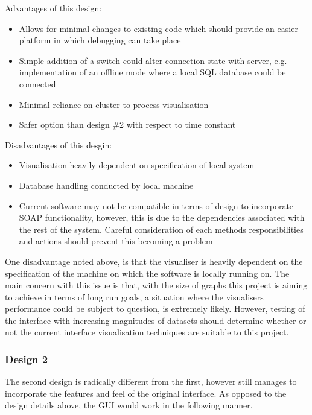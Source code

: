 Advantages of this design:
\begin{itemize}
	\item Allows for minimal changes to existing code which should provide an easier platform in which debugging can take place
	
	\item Simple addition of a switch could alter connection state with server, e.g. implementation of an offline mode where a local SQL database could be connected
	
	\item Minimal reliance on cluster to process visualisation
	
	\item Safer option than design \#2 with respect to time constant
\end{itemize}

Disadvantages of this desgin:
\begin{itemize}
	\item Visualisation heavily dependent on specification of local system
	
	\item Database handling conducted by local machine
	
	\item Current software may not be compatible in terms of design to incorporate SOAP functionality, however, this is due to the dependencies associated with the rest of the system. Careful consideration of each methods responsibilities and actions should prevent this becoming a problem
\end{itemize}

One disadvantage noted above, is that the visualiser is heavily dependent on the specification of the machine on which the software is locally running on. The main concern with this issue is that, with the size of graphs this project is aiming to achieve in terms of long run goals, a situation where the visualisers performance could be subject to question, is extremely likely. However, testing of the interface with increasing magnitudes of datasets should determine whether or not the current interface visualisation techniques are suitable to this project.

\subsubsection{Design 2}
The second design is radically different from the first, however still manages to incorporate the features and feel of the original interface. As opposed to the design details above, the GUI would work in the following manner. 

